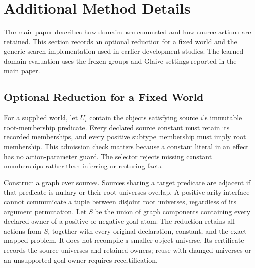 \section{Additional Method Details}
The main paper describes how domains are connected and how source actions are retained. This section records an optional reduction for a fixed world and the generic search implementation used in earlier development studies. The learned-domain evaluation uses the frozen groups and Glaive settings reported in the main paper.

\subsection{Optional Reduction for a Fixed World}
For a supplied world, let $U_i$ contain the objects satisfying source $i$'s immutable root-membership predicate. Every declared source constant must retain its recorded memberships, and every positive subtype membership must imply root membership. This admission check matters because a constant literal in an effect has no action-parameter guard. The selector rejects missing constant memberships rather than inferring or restoring facts.

Construct a graph over sources. Sources sharing a target predicate are adjacent if that predicate is nullary or their root universes overlap. A positive-arity interface cannot communicate a tuple between disjoint root universes, regardless of its argument permutation. Let $S$ be the union of graph components containing every declared owner of a positive or negative goal atom. The reduction retains all actions from $S$, together with every original declaration, constant, and the exact mapped problem. It does not recompile a smaller object universe. Its certificate records the source universes and retained owners; reuse with changed universes or an unsupported goal owner requires recertification.


